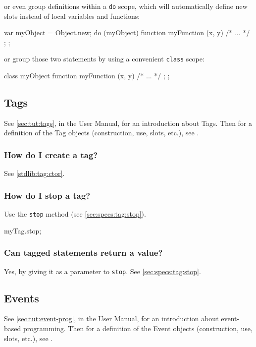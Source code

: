 \noindent
or even group definitions within a \lstinline{do} scope, which will
automatically define new slots instead of local variables and
functions:

\begin{urbiunchecked}
var myObject = Object.new;
do (myObject)
{
  function myFunction (x, y) { /* ... */ };
};
\end{urbiunchecked}

\noindent
or group those two statements by using a convenient \lstinline{class}
scope:

\begin{urbiunchecked}
class myObject
{
  function myFunction (x, y) { /* ... */ };
};
\end{urbiunchecked}


\subsection{Tags}

See \autoref{sec:tut:tags}, in the \us User Manual, for an
introduction about Tags.  Then for a definition of the Tag objects
(construction, use, slots, etc.), see .

\subsubsection{How do I create a tag?}
See \autoref{stdlib:tag:ctor}.

\subsubsection{How do I stop a tag?}
Use the \lstinline|stop| method (see \autoref{sec:specs:tag:stop}).
\begin{urbiunchecked}
myTag.stop;
\end{urbiunchecked}

\subsubsection{Can tagged statements return a value?}
Yes, by giving it as a parameter to \lstinline{stop}.  See
\autoref{sec:specs:tag:stop}.


\subsection{Events}

See \autoref{sec:tut:event-prog}, in the \us User Manual, for an
introduction about event-based programming.  Then for a definition of
the Event objects (construction, use, slots, etc.), see
.

